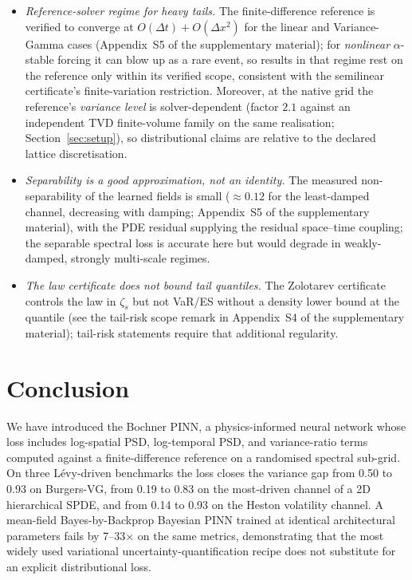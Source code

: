 \documentclass[review,12pt]{elsarticle}
\begin{document}
\begin{itemize}
bound, but it depends on $\lambda_{\min}(K)$ for the log-PSD NTK Gram
matrix, which is not lower-bounded here. Lower-bounding
$\lambda_{\min}(K^{\mathrm{spec}})$ is the remaining open problem
in making the end-to-end bound fully constructive
(see Appendix~S1 of the supplementary material).
\item \emph{Reference-solver regime for heavy tails.} The
finite-difference reference is verified to converge at
$O(\Delta t) + O(\Delta x^2)$ for the linear and Variance-Gamma cases
(Appendix~S5 of the supplementary material); for \emph{nonlinear}
$\alpha$-stable forcing it can blow up as a rare event, so results in
that regime rest on the reference only within its verified scope,
consistent with the semilinear certificate's finite-variation
restriction. Moreover, at the native grid the reference's
\emph{variance level} is solver-dependent (factor $2.1$ against an
independent TVD finite-volume family on the same realisation;
Section~\ref{sec:setup}), so distributional claims are relative to the
declared lattice discretisation.
\item \emph{Separability is a good approximation, not an identity.}
The measured non-separability of the learned fields is small
($\approx 0.12$ for the least-damped channel, decreasing with damping;
Appendix~S5 of the supplementary material), with the PDE residual
supplying the residual space--time coupling; the separable spectral
loss is accurate here but would degrade in weakly-damped, strongly
multi-scale regimes.
\item \emph{The law certificate does not bound tail quantiles.} The
Zolotarev certificate controls the law in $\zeta_s$ but not VaR/ES
without a density lower bound at the quantile (see the tail-risk scope
remark in Appendix~S4 of the supplementary material); tail-risk
statements require that additional regularity.
\end{itemize}

\section{Conclusion}
\label{sec:conclusion}

We have introduced the Bochner PINN, a physics-informed neural
network whose loss includes log-spatial PSD, log-temporal PSD,
and variance-ratio terms computed against a finite-difference
reference on a randomised spectral sub-grid. On three L\'evy-driven
benchmarks the loss closes the variance gap from 0.50 to 0.93 on
Burgers-VG, from 0.19 to 0.83 on the most-driven channel of a
2D hierarchical SPDE, and from 0.14 to 0.93 on the Heston
volatility channel. A mean-field Bayes-by-Backprop Bayesian PINN
trained at identical architectural parameters fails by
7--33\(\times\) on the same metrics, demonstrating that the most
widely used variational uncertainty-quantification recipe does
not substitute for an explicit distributional loss.
\end{document}
